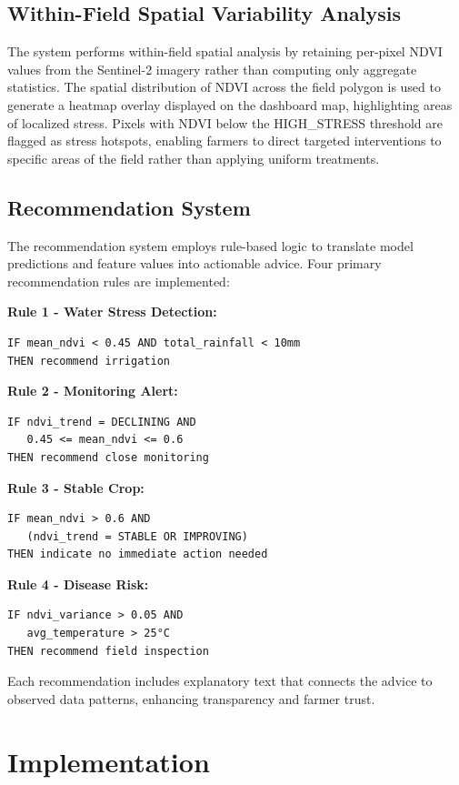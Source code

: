 \documentclass[journal]{IEEEtran}
\begin{document}
\subsection{Within-Field Spatial Variability Analysis}

The system performs within-field spatial analysis by retaining per-pixel NDVI values from the Sentinel-2 imagery rather than computing only aggregate statistics. The spatial distribution of NDVI across the field polygon is used to generate a heatmap overlay displayed on the dashboard map, highlighting areas of localized stress. Pixels with NDVI below the HIGH\_STRESS threshold are flagged as stress hotspots, enabling farmers to direct targeted interventions to specific areas of the field rather than applying uniform treatments.

\subsection{Recommendation System}

The recommendation system employs rule-based logic to translate model predictions and feature values into actionable advice. Four primary recommendation rules are implemented:

\textbf{Rule 1 - Water Stress Detection:}
\begin{verbatim}
IF mean_ndvi < 0.45 AND total_rainfall < 10mm
THEN recommend irrigation
\end{verbatim}

\textbf{Rule 2 - Monitoring Alert:}
\begin{verbatim}
IF ndvi_trend = DECLINING AND 
   0.45 <= mean_ndvi <= 0.6
THEN recommend close monitoring
\end{verbatim}

\textbf{Rule 3 - Stable Crop:}
\begin{verbatim}
IF mean_ndvi > 0.6 AND 
   (ndvi_trend = STABLE OR IMPROVING)
THEN indicate no immediate action needed
\end{verbatim}

\textbf{Rule 4 - Disease Risk:}
\begin{verbatim}
IF ndvi_variance > 0.05 AND 
   avg_temperature > 25°C
THEN recommend field inspection
\end{verbatim}

Each recommendation includes explanatory text that connects the advice to observed data patterns, enhancing transparency and farmer trust.

\section{Implementation}
\end{document}
